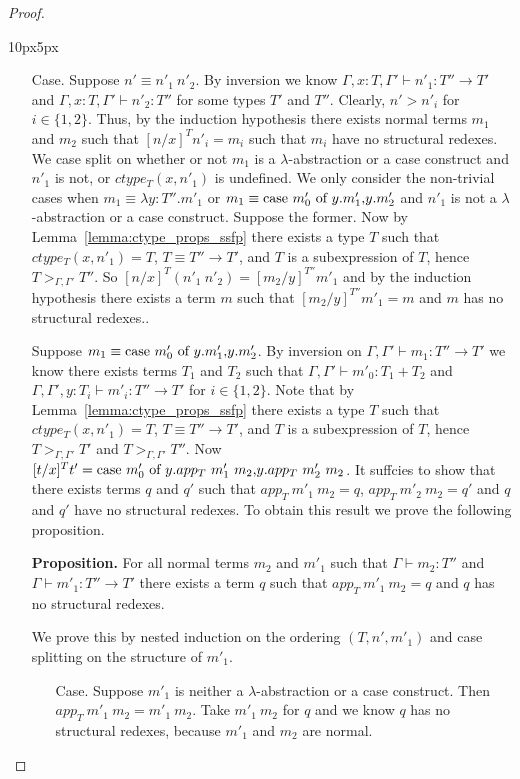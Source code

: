 \begin{proof}
\begin{changemargin}{10px}{5px}
\begin{itemize}
\item[Case.] Suppose $n' \equiv n'_1\ n'_2$.  By inversion we know
  $\Gamma, x:T, \Gamma' \vdash n'_1 : T'' \to T'$ and
  $\Gamma, x:T, \Gamma' \vdash n'_2 : T''$ for some types $T'$ and $T''$.
  Clearly, $n' > n'_i$ for $i \in \{1,2\}$.  Thus, by the induction hypothesis
  there exists normal terms $m_1$ and $m_2$ such that $[n/x]^T n'_i = m_i$ such that $m_i$ have no
  structural redexes.  We case split on whether or not $m_1$ is a $\lambda$-abstraction
  or a case construct and $n'_1$ is not, or $ctype_T(x,n'_1)$ is undefined.  
  We only consider the non-trivial cases when 
  $m_1 \equiv \lambda y:T''.m'_1$ or $m_1 \equiv \mbox{case}\ m'_0\ \text{of}\ y\text{.}m'_1\text{,}y\text{.}m'_2$ and $n'_1$
  is not a $\lambda$-abstraction or a case construct.
  Suppose the former.  
  Now by Lemma~\ref{lemma:ctype_props_ssfp} there exists a type $T$ such that 
  $ctype_T(x, n'_1) = T$, $T \equiv T'' \to T'$, and $T$ is a subexpression
  of $T$, hence $T >_{\Gamma,\Gamma'} T''$. So $[n/x]^T (n'_1\ n'_2) = [m_2/y]^{T''} m'_1$ and
  by the induction hypothesis there exists a term $m$ such that 
  $[m_2/y]^{T''} m'_1 = m$ and $m$ has no structural redexes..  
  
  Suppose $m_1 \equiv \mbox{case}\ m'_0\ \text{of}\ y\text{.}m'_1\text{,}y\text{.}m'_2$.
  By inversion on
  $\Gamma,\Gamma' \vdash m_1 : T'' \to T'$ we know there exists terms $T_1$ and $T_2$ such that
  $\Gamma,\Gamma' \vdash m'_0:T_1+T_2$ and
  $\Gamma,\Gamma',y:T_i \vdash m'_i:T'' \to T'$
  for $i \in \{1,2\}$.  Note that by Lemma~\ref{lemma:ctype_props_ssfp} there exists a type $T$ such that 
  $ctype_T(x, n'_1) = T$, $T \equiv T'' \to T'$, and $T$ is a subexpression
  of $T$, hence $T >_{\Gamma,\Gamma'} T'$ and $T >_{\Gamma,\Gamma'} T''$.  
  Now $[t/x]^T t' = \ccon{m'_0}{y}{app_T\ m'_1\ m_2}{app_T\ m'_2\ m_2}$.  It suffcies to show that
  there exists terms $q$ and $q'$ such that $app_T\ m'_1\ m_2 = q$, $app_T\ m'_2\ m_2 = q'$ and $q$ and $q'$ have
  no structural redexes.  To obtain this result we prove the following proposition.
  
  {\bf Proposition.}  For all normal terms $m_2$ and $m'_1$ such that  
  $\Gamma \vdash m_2 : T''$ and $\Gamma \vdash m'_1:T'' \to T'$
  there exists a term $q$ such that $app_T\ m'_1\ m_2 = q$ and $q$ has no structural redexes.
  
  We prove this by nested induction on the ordering $(T, n', m'_1)$ and case splitting on 
  the structure of $m'_1$.
  \begin{itemize}
  \item[Case.] Suppose $m'_1$ is neither a $\lambda$-abstraction or a
    case construct.  Then \\
    $app_T\  m'_1\ m_2 = m'_1\ m_2$.  Take $m'_1\ m_2$ for $q$ and we know $q$ has no structural
    redexes, because $m'_1$ and $m_2$ are normal.
    

\end{itemize}
\end{itemize}
\end{changemargin}
\end{proof}
